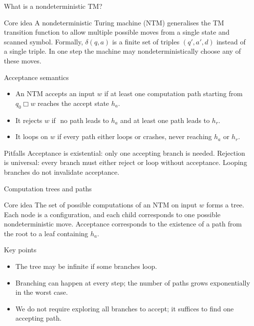 \begin{frame}[t]{What is a nondeterministic TM?}
  \begin{tblock}{Core idea}
    A nondeterministic Turing machine (NTM) generalises the TM
    transition function to allow multiple possible moves from a single
    state and scanned symbol.  Formally, $\delta(q,a)$ is a finite set
    of triples $(q',a',d)$ instead of a single triple.  In one step the
    machine may nondeterministically choose any of these moves.
  \end{tblock}
  \begin{tblock}{Acceptance semantics}
    \begin{itemize}
      \item An NTM accepts an input $w$ if at least one computation
        path starting from $q_0\Box w$ reaches the accept state $h_a$.
      \item It rejects $w$ if 
        ​
        no path leads to $h_a$ and at least one path leads to $h_r$.
      \item It loops on $w$ if every path either loops or crashes,
        never reaching $h_a$ or $h_r$.
    \end{itemize}
  \end{tblock}
  \begin{talert}{Pitfalls}
    Acceptance is existential: only one accepting branch is needed.
    Rejection is universal: every branch must either reject or loop
    without acceptance.  Looping branches do not invalidate acceptance.
  \end{talert}
  \label{fr:7.7-01}
\end{frame}

\begin{frame}[t]{Computation trees and paths}
  \begin{tblock}{Core idea}
    The set of possible computations of an NTM on input $w$ forms a
    tree.  Each node is a configuration, and each child corresponds
    to one possible nondeterministic move.  Acceptance corresponds to
    the existence of a path from the root to a leaf containing $h_a$.
  \end{tblock}
  \begin{tblock}{Key points}
    \begin{itemize}
      \item The tree may be infinite if some branches loop.
      \item Branching can happen at every step; the number of paths
        grows exponentially in the worst case.
      \item We do not require exploring all branches to accept; it
        suffices to find one accepting path.
    \end{itemize}
  \end{tblock}
  \label{fr:7.7-02}
\end{frame}

